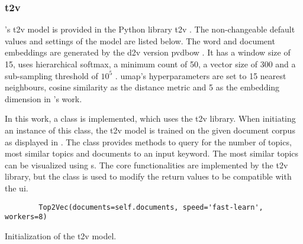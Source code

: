 \subsubsection*{\ac{t2v}}\label{subsubsec:impl-top2vec}

\citeauthor{Top2Vec2020}'s \ac{t2v} model is provided in the Python library \ac{t2v} \cite{Top2Vec2020}.
The non-changeable default values and settings of the model are listed below.
The word and document embeddings are generated by the \ac{d2v} version \ac{pvdbow} \cite{Top2Vec2020}.
It has a window size of 15, uses hierarchical softmax, a minimum count of 50, a vector size of 300 and a sub-sampling threshold of $10^5$ \cite{Top2Vec2020}.
\ac{umap}'s hyperparameters are set to 15 nearest neighbours, cosine similarity as the distance metric and 5 as the embedding dimension in \citeauthor{Top2Vec2020}'s work.

In this work, a class is implemented, which uses the \ac{t2v} library.
When initiating an instance of this class, the \ac{t2v} model is trained on the given document corpus as displayed in .
The class provides methods to query for the number of topics, 
most similar topics and documents to an input keyword.
The most similar topics can be visualized using \wordcloud{}s.
The core functionalities are implemented by the \ac{t2v} library, but the class is used to modify the return values to be compatible with the \ac{ui}.


\begin{listing}[htp]
    \begin{verbatim}
        Top2Vec(documents=self.documents, speed='fast-learn', workers=8)
    \end{verbatim}
    \caption[Initialization of the \ac{t2v} model]
    {Initialization of the \ac{t2v} model.
    }
    \label{lst:init-top2vec}
\end{listing}